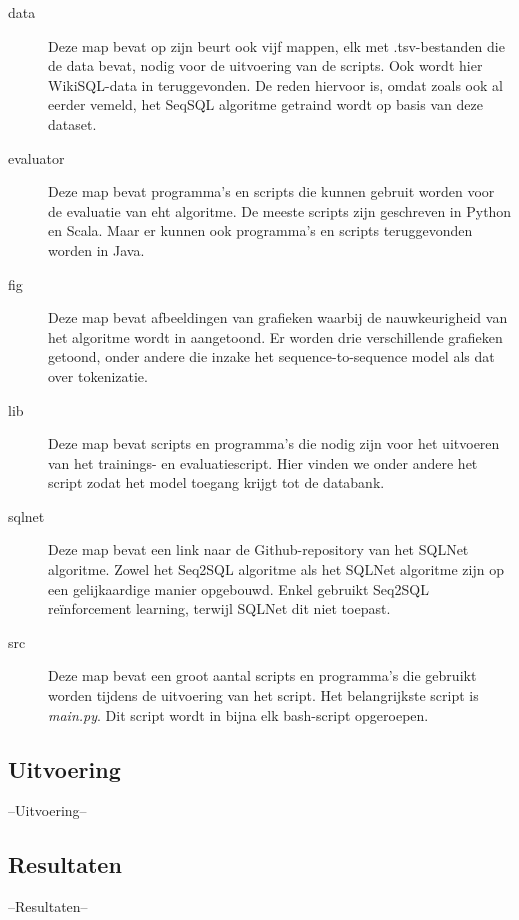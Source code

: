 \begin{description}
	\item[data] Deze map bevat op zijn beurt ook vijf mappen, elk met .tsv-bestanden die de data bevat, nodig voor de uitvoering van de scripts. Ook wordt hier WikiSQL-data in teruggevonden. De reden hiervoor is, omdat zoals ook al eerder vemeld, het SeqSQL algoritme getraind wordt op basis van deze dataset.
	\item[evaluator] Deze map bevat programma's en scripts die kunnen gebruit worden voor de evaluatie van eht algoritme. De meeste scripts zijn geschreven in Python en Scala. Maar er kunnen ook programma's en scripts teruggevonden worden in Java. 
	\item[fig] Deze map bevat afbeeldingen van grafieken waarbij de nauwkeurigheid van het algoritme wordt in aangetoond. Er worden drie verschillende grafieken getoond, onder andere die inzake het sequence-to-sequence model als dat over tokenizatie.
	\item[lib] Deze map bevat scripts en programma's die nodig zijn voor het uitvoeren van het trainings- en evaluatiescript. Hier vinden we onder andere het script zodat het model toegang krijgt tot de databank.
	\item[sqlnet] Deze map bevat een link naar de Github-repository van het SQLNet algoritme. Zowel het Seq2SQL algoritme als het SQLNet algoritme zijn op een gelijkaardige manier opgebouwd. Enkel gebruikt Seq2SQL reïnforcement learning, terwijl SQLNet dit niet toepast.
	\item[src] Deze map bevat een groot aantal scripts en programma's die gebruikt worden tijdens de uitvoering van het script. Het belangrijkste script is \textit{main.py}. Dit script wordt in bijna elk bash-script opgeroepen.
\end{description}

\subsection{Uitvoering}


--Uitvoering--

\subsection{Resultaten}

--Resultaten--

